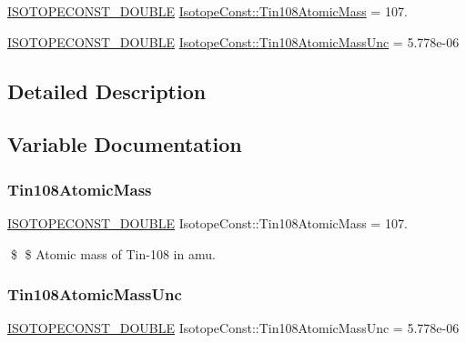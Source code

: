 \begin{DoxyCompactItemize}
\item 
\mbox{\hyperlink{group___isotope_const-_macros_ga8f45a7272ce02c0b4c65c44636ed719a}{I\+S\+O\+T\+O\+P\+E\+C\+O\+N\+S\+T\+\_\+\+D\+O\+U\+B\+LE}} \mbox{\hyperlink{group___isotope_const-_tin-_sn108_gafecd7387cbbb41c7b67f62a63712d772}{Isotope\+Const\+::\+Tin108\+Atomic\+Mass}} = 107.
\item 
\mbox{\hyperlink{group___isotope_const-_macros_ga8f45a7272ce02c0b4c65c44636ed719a}{I\+S\+O\+T\+O\+P\+E\+C\+O\+N\+S\+T\+\_\+\+D\+O\+U\+B\+LE}} \mbox{\hyperlink{group___isotope_const-_tin-_sn108_ga64654a06a880063c53b62139a411b833}{Isotope\+Const\+::\+Tin108\+Atomic\+Mass\+Unc}} = 5.\+778e-\/06
\end{DoxyCompactItemize}


\subsection{Detailed Description}


\subsection{Variable Documentation}
\mbox{\label{group___isotope_const-_tin-_sn108_gafecd7387cbbb41c7b67f62a63712d772}} 
\subsubsection{\texorpdfstring{Tin108\+Atomic\+Mass}{Tin108AtomicMass}}
{\footnotesize\ttfamily \mbox{\hyperlink{group___isotope_const-_macros_ga8f45a7272ce02c0b4c65c44636ed719a}{I\+S\+O\+T\+O\+P\+E\+C\+O\+N\+S\+T\+\_\+\+D\+O\+U\+B\+LE}} Isotope\+Const\+::\+Tin108\+Atomic\+Mass = 107.}

\$ \$ Atomic mass of Tin-\/108 in amu. \mbox{\label{group___isotope_const-_tin-_sn108_ga64654a06a880063c53b62139a411b833}} 
\subsubsection{\texorpdfstring{Tin108\+Atomic\+Mass\+Unc}{Tin108AtomicMassUnc}}
{\footnotesize\ttfamily \mbox{\hyperlink{group___isotope_const-_macros_ga8f45a7272ce02c0b4c65c44636ed719a}{I\+S\+O\+T\+O\+P\+E\+C\+O\+N\+S\+T\+\_\+\+D\+O\+U\+B\+LE}} Isotope\+Const\+::\+Tin108\+Atomic\+Mass\+Unc = 5.\+778e-\/06}

